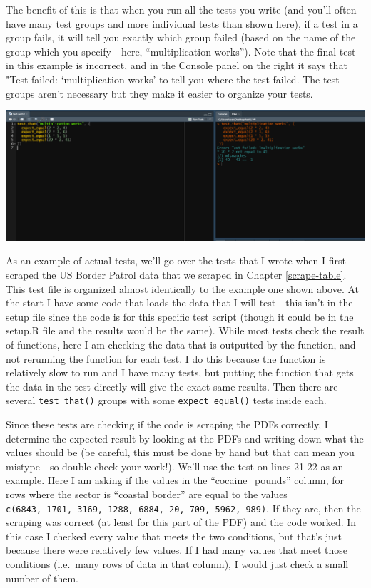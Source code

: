 \documentclass[
]{krantz}
\begin{document}
The benefit of this is that when you run all the tests you write (and you'll often have many test groups and more individual tests than shown here), if a test in a group fails, it will tell you exactly which group failed (based on the name of the group which you specify - here, ``multiplication works''). Note that the final test in this example is incorrect, and in the Console panel on the right it says that "Test failed: `multiplication works' to tell you where the test failed. The test groups aren't necessary but they make it easier to organize your tests.

\includegraphics{images/usethis_test_default_example2.PNG}

As an example of actual tests, we'll go over the tests that I wrote when I first scraped the US Border Patrol data that we scraped in Chapter \ref{scrape-table}. This test file is organized almost identically to the example one shown above. At the start I have some code that loads the data that I will test - this isn't in the setup file since the code is for this specific test script (though it could be in the setup.R file and the results would be the same). While most tests check the result of functions, here I am checking the data that is outputted by the function, and not rerunning the function for each test. I do this because the function is relatively slow to run and I have many tests, but putting the function that gets the data in the test directly will give the exact same results. Then there are several \texttt{test\_that()} groups with some \texttt{expect\_equal()} tests inside each.

Since these tests are checking if the code is scraping the PDFs correctly, I determine the expected result by looking at the PDFs and writing down what the values should be (be careful, this must be done by hand but that can mean you mistype - so double-check your work!). We'll use the test on lines 21-22 as an example. Here I am asking if the values in the ``cocaine\_pounds'' column, for rows where the sector is ``coastal border'' are equal to the values \texttt{c(6843,\ 1701,\ 3169,\ 1288,\ 6884,\ 20,\ 709,\ 5962,\ 989)}. If they are, then the scraping was correct (at least for this part of the PDF) and the code worked. In this case I checked every value that meets the two conditions, but that's just because there were relatively few values. If I had many values that meet those conditions (i.e.~many rows of data in that column), I would just check a small number of them.
\end{document}
